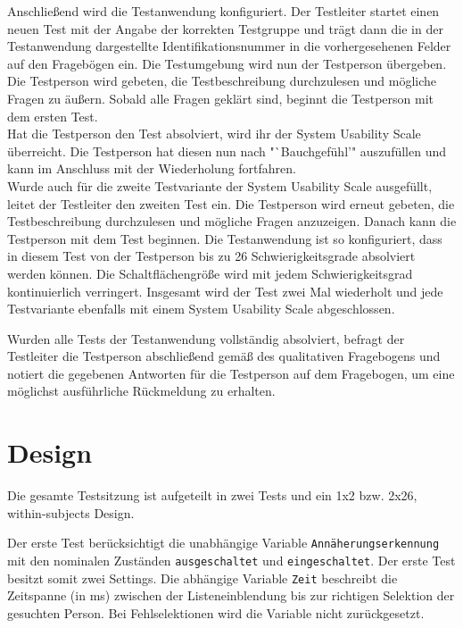 \documentclass[a4paper,12pt,bibliography=totoc]{scrreprt}%
\begin{document}
Anschließend wird die Testanwendung konfiguriert. Der Testleiter startet einen neuen Test mit der Angabe der korrekten Testgruppe und trägt dann die in der Testanwendung dargestellte Identifikationsnummer in die vorhergesehenen Felder auf den Fragebögen ein. Die Testumgebung wird nun der Testperson übergeben. Die Testperson wird gebeten, die Testbeschreibung durchzulesen und mögliche Fragen zu äußern. Sobald alle Fragen geklärt sind, beginnt die Testperson mit dem ersten Test.\\
Hat die Testperson den Test absolviert, wird ihr der System Usability Scale überreicht. Die Testperson hat diesen nun nach "`Bauchgefühl'" auszufüllen und kann im Anschluss mit der Wiederholung fortfahren.\\
Wurde auch für die zweite Testvariante der System Usability Scale ausgefüllt, leitet der Testleiter den zweiten Test ein. Die Testperson wird erneut gebeten, die Testbeschreibung durchzulesen und mögliche Fragen anzuzeigen. Danach kann die Testperson mit dem Test beginnen. Die Testanwendung ist so konfiguriert, dass in diesem Test von der Testperson bis zu 26 Schwierigkeitsgrade absolviert werden können. Die Schaltflächengröße wird mit jedem Schwierigkeitsgrad kontinuierlich verringert. Insgesamt wird der Test zwei Mal wiederholt und jede Testvariante ebenfalls mit einem System Usability Scale abgeschlossen.

Wurden alle Tests der Testanwendung vollständig absolviert, befragt der Testleiter die Testperson abschließend gemäß des qualitativen Fragebogens und notiert die gegebenen Antworten für die Testperson auf dem Fragebogen, um eine möglichst ausführliche Rückmeldung zu erhalten. 

\section{Design}
Die gesamte Testsitzung ist aufgeteilt in zwei Tests und ein 1x2 bzw. 2x26, within-subjects Design.

Der erste Test berücksichtigt die unabhängige Variable {\tt Annäherungserkennung} mit den nominalen Zuständen {\tt ausgeschaltet} und {\tt eingeschaltet}. Der erste Test besitzt somit zwei Settings. Die abhängige Variable {\tt Zeit} beschreibt die Zeitspanne (in ms) zwischen der Listeneinblendung bis zur richtigen Selektion der gesuchten Person. Bei Fehlselektionen wird die Variable nicht zurückgesetzt.
\end{document}
